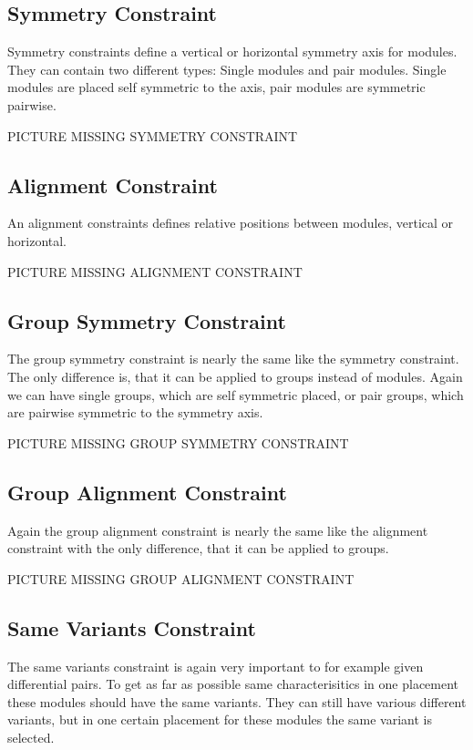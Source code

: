 \subsection{Symmetry Constraint}
Symmetry constraints define a vertical or horizontal symmetry axis for modules. They can contain two different types: Single modules and pair modules. Single modules are placed self symmetric to the axis, pair modules are symmetric pairwise.

PICTURE MISSING SYMMETRY CONSTRAINT

\subsection{Alignment Constraint}
An alignment constraints defines relative positions between modules, vertical or horizontal.

PICTURE MISSING ALIGNMENT CONSTRAINT

\subsection{Group Symmetry Constraint}
The group symmetry constraint is nearly the same like the symmetry constraint. The only difference is, that it can be applied to groups instead of modules. Again we can have single groups, which are self symmetric placed, or pair groups, which are pairwise symmetric to the symmetry axis.

PICTURE MISSING GROUP SYMMETRY CONSTRAINT

\subsection{Group Alignment Constraint}
Again the group alignment constraint is nearly the same like the alignment constraint with the only difference, that it can be applied to groups.

PICTURE MISSING GROUP ALIGNMENT CONSTRAINT

\subsection{Same Variants Constraint}
The same variants constraint is again very important to for example given differential pairs. To get as far as possible same characterisitics in one placement these modules should have the same variants. They can still have various different variants, but in one certain placement for these modules the same variant is selected.


